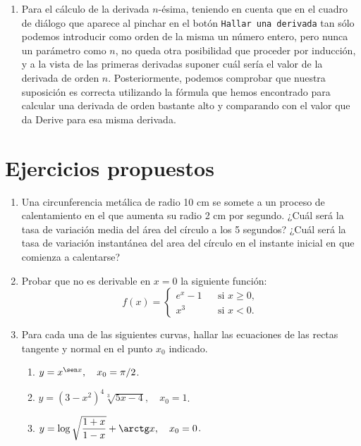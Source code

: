 \begin{enumerate}[leftmargin=*]
\begin{indicacion}
{\begin{enumerate}
\item Para el cálculo de la derivada $n$-ésima, teniendo en cuenta
que en el cuadro de diálogo que aparece al pinchar en el botón
\texttt{Hallar una derivada} tan sólo podemos introducir como
orden de la misma un número entero, pero nunca un parámetro como
$n$, no queda otra posibilidad que proceder por inducción, y a la
vista de las primeras derivadas suponer cuál sería el valor de la
derivada de orden $n$. Posteriormente, podemos comprobar que
nuestra suposición es correcta utilizando la fórmula que hemos
encontrado para calcular una derivada de orden bastante alto y
comparando con el valor que da Derive para esa misma derivada.

\end{enumerate}
}
\end{indicacion}


\end{enumerate}

\section{Ejercicios propuestos}
\begin{enumerate}[leftmargin=*]

\item Una circunferencia metálica de radio 10 cm  se somete a un proceso de calentamiento en el que aumenta su radio 2 cm por segundo. ¿Cuál será la tasa de variación media del área del círculo a los 5 segundos? ¿Cuál será la tasa de variación instantánea del area del círculo en el instante inicial en que comienza a calentarse?

\item  Probar que no es derivable en $x=0$ la siguiente función:
\[ f(x)=\left\{
\begin{array}{ccl}
    e^x-1 &  & \mbox{si } x\geq 0,  \\
    x^3 &  & \mbox{si } x<0.
\end{array}\right.
\]

\item  Para cada una de las siguientes curvas, hallar las ecuaciones
de las rectas tangente y normal en el punto $x_{0}$ indicado.
\begin{enumerate}
    \item  $y=x^{\sen x},\quad x_{0}=\pi/2$.

    \item  $y=(3-x^2)^4\sqrt[3]{5x-4},\quad x_{0}=1$.

    \item  $y=\log \sqrt{\dfrac{1+x}{1-x}}+\arctg x, \quad x_{0}=0$.
\end{enumerate}

\end{enumerate}

